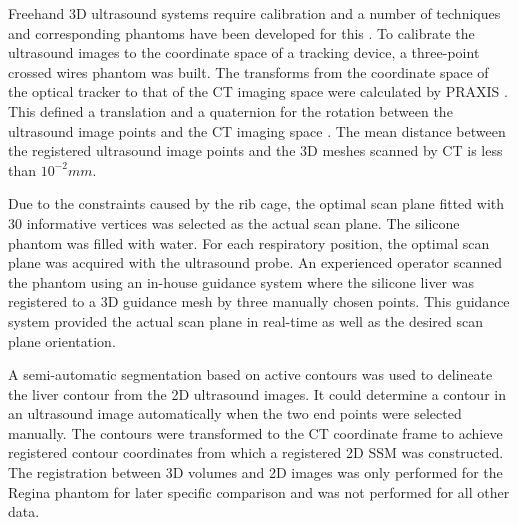 \documentclass[review]{elsarticle}
\begin{document}
Freehand 3D ultrasound systems require calibration and a number of techniques and corresponding phantoms have been developed for this \citep{mercier2005review}. To calibrate the ultrasound images to the coordinate space of a tracking device, a three-point crossed wires phantom was built. The transforms from the coordinate space of the optical tracker to that of the CT imaging space were calculated by PRAXIS \citep{gegenfurtner1992praxis}. This defined a translation and a quaternion for the rotation between the ultrasound image points and the CT imaging space \citep{prager1998rapid}. The mean distance between the registered ultrasound image points and the 3D meshes scanned by CT is less than $10^{-2}mm$.

Due to the constraints caused by the rib cage, the optimal scan plane fitted with 30 informative vertices was selected as the actual scan plane. The silicone phantom was filled with water. For each respiratory position, the optimal scan plane was acquired with the ultrasound probe. An experienced operator scanned the phantom using an in-house guidance system where the silicone liver was registered to a 3D guidance mesh by three manually chosen points. This guidance system provided the actual scan plane in real-time as well as the desired scan plane orientation.

A semi-automatic segmentation based on active contours \citep{geiger1995dynamic} was used to delineate the liver contour from the 2D ultrasound images. It could determine a contour in an ultrasound image automatically when the two end points were selected manually. The contours were transformed to the CT coordinate frame to achieve registered contour coordinates from which a registered 2D SSM was constructed. The registration between 3D volumes and 2D images was only performed for the Regina phantom for later specific comparison and was not performed for all other data. 
\end{document}
